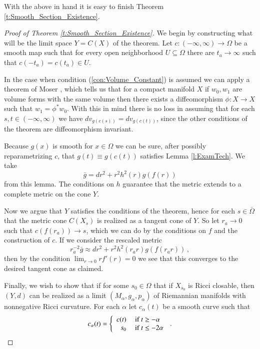 \documentclass[11pt]{article}
\begin{document}
With the above in hand it is easy to finish Theorem \ref{t:Smooth_Section_Existence}.

\begin{proof}[Proof of Theorem \ref{t:Smooth_Section_Existence}]
We begin by constructing what will be the limit space $Y=C(X)$ of the theorem.  Let $c:(-\infty,\infty)\rightarrow\Omega$ be a smooth map such that for every open neighborhood $U\subseteq \Omega$ there are $t_a\rightarrow\infty$ such that $c(-t_a)=c(t_a)\in U$.  

In the case when condition (\ref{con:Volume_Constant}) is assumed we can apply a theorem of Moser \cite{Mo}, which tells us that for a compact manifold $X$ if $w_0,w_1$ are volume forms with the same volume then there exists a diffeomorphism $\phi:X\rightarrow X$ such that $w_1=\phi^*w_0$.  With this in mind there is no loss in assuming that for each $s,t\in (-\infty,\infty)$ we have $dv_{g(c(s))}=dv_{g(c(t))}$, since the other conditions of the theorem are diffeomorphism invariant.

Because $g(x)$ is smooth for $x\in \Omega$ we can be sure, after possibly reparametrizing $c$, that $g(t)\equiv g(c(t))$ satisfies Lemma \ref{l:ExamTech}.  We take
$$\bar{g}=dr^{2}+r^{2}h^{2}(r)g(f(r))$$
from this lemma.  The conditions on $h$ guarantee that the metric extends to a complete metric on the cone $Y$.

Now we argue that $Y$ satisfies the conditions of the theorem, hence for each $s\in \bar\Omega$ that the metric cone $C(X_s)$ is realized as a tangent cone of $Y$.  So let $r_a\rightarrow 0$ such that $c(f(r_a))\rightarrow s$, which we can do by the conditions on $f$ and the construction of $c$.  If we consider the rescaled metric
$$r^{-2}_a\bar{g}\approx dr^{2}+r^{2}h^{2}(r_ar)g(f(r_a r))\, ,$$
then by the condition $\lim_{r\rightarrow 0} rf'(r)=0$ we see that this converges to the desired tangent cone as claimed.

Finally, we wish to show that if for some $s_0\in \Omega$ that if $X_{s_0}$ is Ricci closable, then $(Y,d)$ can be realized as a limit $(M_\alpha,g_\alpha,p_\alpha)$ of Riemannian manifolds with nonnegative Ricci curvature.  For each $\alpha$ let $c_\alpha(t)$ be a smooth curve such that
\begin{align}
c_\alpha(t) = \left\{ \begin{array}{rl}
 c(t)&\mbox{ if } t\geq -\alpha\notag\\
  s_0 &\mbox{ if } t\leq -2\alpha
       \end{array} \right. \, .
\end{align}


\end{proof}
\end{document}
